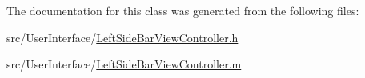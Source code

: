 The documentation for this class was generated from the following files\-:\begin{DoxyCompactItemize}
\item 
src/\-User\-Interface/\hyperlink{_left_side_bar_view_controller_8h}{Left\-Side\-Bar\-View\-Controller.\-h}\item 
src/\-User\-Interface/\hyperlink{_left_side_bar_view_controller_8m}{Left\-Side\-Bar\-View\-Controller.\-m}\end{DoxyCompactItemize}
